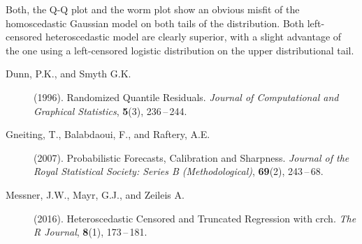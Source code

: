 \documentclass[twoside]{report}
\begin{document}
Both, the Q-Q plot and the worm plot show an obvious misfit of the 
homoscedastic Gaussian model on both tails of the distribution.
Both left-censored heteroscedastic model are clearly superior, with
a slight advantage of the one using a left-censored logistic distribution
on the upper distributional tail.








\begin{description}
    \item [Dunn, P.K., and Smyth G.K.] (1996).
        Randomized Quantile Residuals.
        {\it Journal of Computational and Graphical Statistics},
        {\bf 5}(3), 236\,--\,244.
\item[Gneiting, T., Balabdaoui, F., and Raftery, A.E.] (2007).
    Probabilistic Forecasts, Calibration and Sharpness.
    {\it Journal of the Royal Statistical Society: Series B (Methodological)},
    {\bf 69}(2), 243\,--\,68.
\item [Messner, J.W., Mayr, G.J., and Zeileis A.] (2016).
    Heteroscedastic Censored and Truncated Regression with crch.
    {\it The R Journal},
    {\bf 8}(1), 173\,--\,181.
\end{description}
\end{document}
